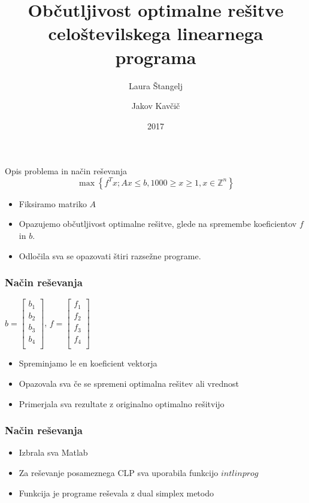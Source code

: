 \documentclass[t]{beamer}
\title{Občutljivost optimalne rešitve celoštevilskega linearnega programa}
\author
{Laura Štangelj \and Jakov Kavčič}
\date{2017}
\begin{document}
\begin{frame}
  \titlepage
\end{frame}

\begin{frame}{Opis problema in način reševanja}
$$\max\left\{f^Tx; Ax \leq b, 1000 \geq x \geq 1, x \in \mathbb{Z}^n \right\}$$
\begin{itemize}
\item Fiksiramo matriko $A$
\item Opazujemo občutljivost optimalne rešitve, glede na spremembe koeficientov $f$ in $b$.
\item Odločila sva se opazovati štiri razsežne programe.
\end{itemize}
\end{frame}

\begin{frame}
\frametitle{Način reševanja}
\begin{center}
$b = \begin{bmatrix}
b_1\\
b_2\\
b_3\\
b_4\\
\end{bmatrix}$, $f = \begin{bmatrix}
f_1\\
f_2\\
f_3\\
f_4\\
\end{bmatrix}$
\end{center}
\begin{itemize}
\item Spreminjamo le en koeficient vektorja
\item Opazovala sva če se spremeni optimalna rešitev ali vrednost
\item Primerjala sva rezultate z originalno optimalno rešitvijo
\end{itemize}
\end{frame}


\begin{frame}
\frametitle{Način reševanja}
\begin{itemize}
\item Izbrala sva Matlab
\item Za reševanje posameznega CLP sva uporabila funkcijo $intlinprog$
\item Funkcija je programe reševala z dual simplex metodo
\end{itemize}
\end{frame}
\end{document}
